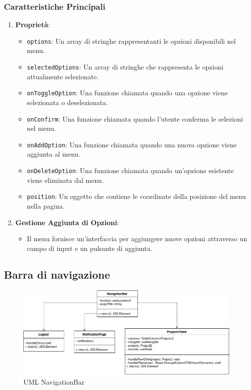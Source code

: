 \documentclass{article}
\begin{document}
\subsubsection*{Caratteristiche Principali}

\begin{enumerate}
    \item \textbf{Proprietà}:
    \begin{itemize}
        \item \texttt{options}: Un array di stringhe rappresentanti le opzioni disponibili nel menu.
        \item \texttt{selectedOptions}: Un array di stringhe che rappresenta le opzioni attualmente selezionate.
        \item \texttt{onToggleOption}: Una funzione chiamata quando una opzione viene selezionata o deselezionata.
        \item \texttt{onConfirm}: Una funzione chiamata quando l'utente conferma le selezioni nel menu.
        \item \texttt{onAddOption}: Una funzione chiamata quando una nuova opzione viene aggiunta al menu.
        \item \texttt{onDeleteOption}: Una funzione chiamata quando un'opzione esistente viene eliminata dal menu.
        \item \texttt{position}: Un oggetto che contiene le coordinate della posizione del menu nella pagina.
    \end{itemize}
    
    \item \textbf{Gestione Aggiunta di Opzioni}:
    \begin{itemize}
        \item Il menu fornisce un'interfaccia per aggiungere nuove opzioni attraverso un campo di input e un pulsante di aggiunta.
    \end{itemize}
\end{enumerate}

\subsection{Barra di navigazione}
\begin{figure}[H]
    \centering
    \includegraphics[width=\textwidth]{documenti/imgUMLFrontend/NavBar.jpg}
    \caption{UML NavigationBar}
    \label{fig:uml-navigatio}
\end{figure}
\end{document}
